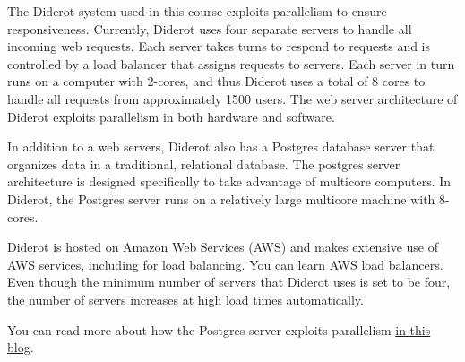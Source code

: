 \begin{example}
The Diderot system  used in this course exploits parallelism
to ensure responsiveness.  
%
Currently, Diderot uses four separate servers to handle all incoming web requests.
%
Each server takes turns to respond to requests and is controlled by a load balancer that assigns requests to servers.
%
Each server in turn runs on a computer with 2-cores, and thus Diderot uses a total of $8$ cores to handle all requests from approximately 1500 users.
%
The web server architecture of Diderot exploits parallelism in both hardware and software.


In addition to a web servers, Diderot also has a Postgres database server that organizes data in a traditional, relational database.  
%
The postgres server architecture is designed specifically to take advantage of multicore computers.
%
In Diderot, the Postgres server runs on a  relatively large multicore machine with 8-cores.   

Diderot is hosted on Amazon Web Services (AWS) and makes extensive use of AWS services, including for load balancing.
%
You can learn
%
\href{https://aws.amazon.com/elasticloadbalancing/}
{AWS load balancers}.
%
Even though the minimum number of servers that Diderot uses is set to be four, the number of servers increases at high load times automatically.

You can read more about how the Postgres server exploits parallelism
%
\href{https://www.percona.com/blog/2019/02/21/parallel-queries-in-postgresql/}
{in this blog}.
\end{example}



